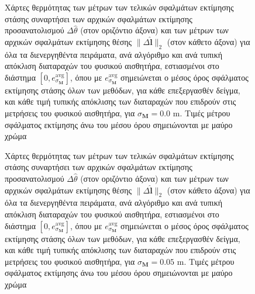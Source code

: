 \begin{figure}\vspace{2cm}\hspace{0.5cm}
  
  \vspace{1cm}
  \caption{\small Χάρτες θερμότητας των μέτρων των τελικών σφαλμάτων εκτίμησης
           στάσης συναρτήσει των αρχικών σφαλμάτων εκτίμησης προσανατολισμού
           $\Delta\hat{\theta}$ (στον οριζόντιο άξονα) και των μέτρων των
           αρχικών σφαλμάτων εκτίμησης θέσης $\|\Delta \hat{\bm{l}}\|_2$ (στον
           κάθετο άξονα) για όλα τα διενεργηθέντα πειράματα, ανά αλγόριθμο και
           ανά τυπική απόκλιση διαταραχών του φυσικού αισθητήρα, εστιασμένοι
           στο διάστημα $[0, e_{\sigma_{\bm{M}}}^{\text{avg}}]$, όπου με
           $e_{\sigma_{\bm{M}}}^{\text{avg}}$ σημειώνεται ο μέσος όρος
           σφάλματος εκτίμησης στάσης όλων των μεθόδων, για κάθε επεξεργασθέν
           δείγμα, και κάθε τιμή τυπικής απόκλισης των διαταραχών που επιδρούν
           στις μετρήσεις του φυσικού αισθητήρα, για $\sigma_{\bm{M}} = 0.0$ m.
           Τιμές μέτρου σφάλματος εκτίμησης άνω του μέσου όρου σημειώνονται με
           μαύρο χρώμα}
  \label{fig:02_04_05:08}
\end{figure}

\begin{figure}\vspace{2cm}\hspace{0.5cm}
  
  \vspace{1cm}
  \caption{\small Χάρτες θερμότητας των μέτρων των τελικών σφαλμάτων εκτίμησης
           στάσης συναρτήσει των αρχικών σφαλμάτων εκτίμησης προσανατολισμού
           $\Delta\hat{\theta}$ (στον οριζόντιο άξονα) και των μέτρων των
           αρχικών σφαλμάτων εκτίμησης θέσης $\|\Delta \hat{\bm{l}}\|_2$ (στον
           κάθετο άξονα) για όλα τα διενεργηθέντα πειράματα, ανά αλγόριθμο και
           ανά τυπική απόκλιση διαταραχών του φυσικού αισθητήρα, εστιασμένοι
           στο διάστημα $[0, e_{\sigma_{\bm{M}}}^{\text{avg}}]$, όπου με
           $e_{\sigma_{\bm{M}}}^{\text{avg}}$ σημειώνεται ο μέσος όρος
           σφάλματος εκτίμησης στάσης όλων των μεθόδων, για κάθε επεξεργασθέν
           δείγμα, και κάθε τιμή τυπικής απόκλισης των διαταραχών που επιδρούν
           στις μετρήσεις του φυσικού αισθητήρα, για $\sigma_{\bm{M}} = 0.05$
           m.  Τιμές μέτρου σφάλματος εκτίμησης άνω του μέσου όρου σημειώνονται
           με μαύρο χρώμα}
  \label{fig:02_04_05:09}
\end{figure}



